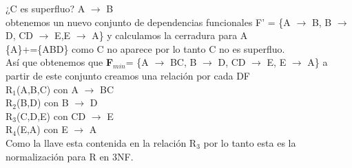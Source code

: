\documentclass{article}
\begin{document}
\begin{enumerate}
\begin{itemize}
\begin{enumerate}
\begin{itemize}
   			¿C es superfluo? A $\rightarrow$ B\\
   			obtenemos un nuevo conjunto de dependencias funcionales F' = \{A $\rightarrow$ B, B $\rightarrow$ D, CD $\rightarrow$ E,E $\rightarrow$ A\} y calculamos la cerradura para A\\
   			\{A\}+=\{ABD\} como C no aparece por lo tanto C no es superfluo.\\
   			
   			Así que obtenemos que \textbf{F$_{min}$}= \{A $\rightarrow$ BC, B $\rightarrow$ D, CD $\rightarrow$ E, E $\rightarrow$ A\} a partir de este conjunto creamos una relación por cada DF\\
   			R$_1$(A,B,C) con A $\rightarrow$ BC\\
   			R$_2$(B,D) con  B $\rightarrow$ D\\
   			R$_3$(C,D,E) con CD $\rightarrow$ E\\
   			R$_4$(E,A) con E $\rightarrow$ A\\
   			
   			Como la llave esta contenida en la relación R$_3$ por lo tanto esta es la normalización para R en 3NF.\\
   			
   		\end{itemize}
   	\end{enumerate}
   	
   \end{itemize}
 

\end{enumerate}
\end{document}
